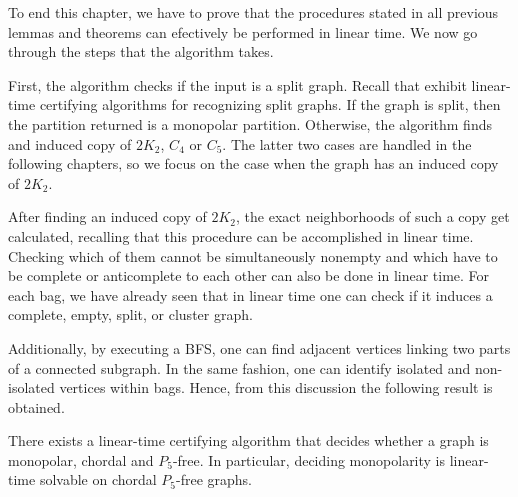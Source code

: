 To end this chapter, we have to prove that the procedures stated in all previous
lemmas and theorems can efectively be performed in linear time. We now go
through the steps that the algorithm takes.

First, the algorithm checks if the input is a split graph. Recall that
\cite{heggernesNJC14,hellDAM141} exhibit linear-time certifying algorithms for
recognizing split graphs. If the graph is split, then the partition returned is
a monopolar partition. Otherwise, the algorithm finds and induced copy of
$2K_2$, $C_4$ or $C_5$. The latter two cases are handled in the following
chapters, so we focus on the case when the graph has an induced copy of $2K_2$.

After finding an induced copy of $2K_2$, the exact neighborhoods of such a copy
get calculated, recalling that this procedure can be accomplished in linear
time. Checking which of them cannot be simultaneously nonempty and which have to
be complete or anticomplete to each other can also be done in linear time. For
each bag, we have already seen that in linear time one can check if it induces a
complete, empty, split, or cluster graph.

Additionally, by executing a BFS, one can find adjacent vertices linking two
parts of a connected subgraph. In the same fashion, one can identify isolated
and non-isolated vertices within bags. Hence, from this discussion the following
result is obtained.

\begin{corollary}
    \label{cor:algorithm_chordal}
    There exists a linear-time certifying algorithm that decides whether a graph
    is monopolar, chordal and $P_5$-free. In particular, deciding monopolarity
    is linear-time solvable on chordal $P_5$-free graphs.
\end{corollary}
